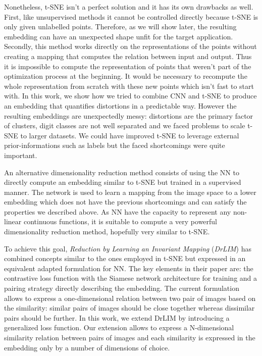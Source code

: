 \documentclass[a4paper,12pt]{report}
\begin{document}
Nonetheless, t-SNE isn't a perfect solution and it has its own drawbacks as well.
First, like unsupervised methods it cannot be controlled directly because t-SNE is only given unlabelled points.
Therefore, as we will show later, the resulting embedding can have an unexpected shape unfit for the target application.
Secondly, this method works directly on the representations of the points without creating a mapping that computes the relation between input and output.
Thus it is impossible to compute the representation of points that weren't part of the optimization process at the beginning.
It would be necessary to recompute the whole representation from scratch with these new points which isn't fast to start with.
In this work, we show how we tried to combine CNN and t-SNE to produce an embedding that quantifies distortions in a predictable way.
However the resulting embeddings are unexpectedly messy: distortions are the primary factor of clusters, digit classes are not well separated and we faced problems to scale t-SNE to larger datasets.
We could have improved t-SNE to leverage external prior-informations such as labels but the faced shortcomings were quite important.

An alternative dimensionality reduction method consists of using the NN to directly compute an embedding similar to t-SNE but trained in a supervised manner.
The network is used to learn a mapping from the image space to a lower embedding which does not have the previous shortcomings and can satisfy the properties we described above.
As NN have the capacity to represent any non-linear continuous functions\cite{csaji2001approximation}, it is suitable to compute a very powerful dimensionality reduction method, hopefully very similar to t-SNE.

To achieve this goal, {\em Reduction by Learning an Invariant Mapping} ({\em DrLIM}) has combined concepts similar to the ones employed in t-SNE but expressed in an equivalent adapted formulation for NN.
The key elements in their paper are: the contrastive loss function with the Siamese network architecture for training and a pairing strategy directly describing the embedding.
The current formulation allows to express a one-dimensional relation between two pair of images based on the similarity: similar pairs of images should be close together whereas dissimilar pairs should be further.
In this work, we extend DrLIM by introducing a generalized loss function.
Our extension allows to express a N-dimensional similarity relation between pairs of images and each similarity is expressed in the embedding only by a number of dimensions of choice.
\end{document}
